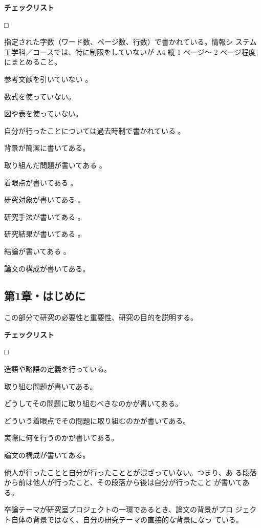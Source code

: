 \documentclass[11pt,a4j]{jsarticle}
\begin{document}
\begin{flushleft}
 {\bf チェックリスト}
\end{flushleft}
\begin{list}%
 {□} %
 {} %
 \item 指定された字数（ワード数、ページ数、行数）で書かれている。情報シ
       ステム工学科／コースでは、特に制限をしていないが A4 縦 1 ページ〜
       2 ページ程度にまとめること。
 \item 参考文献を引いていない \cite{R.A.Day_HowToWrite_Ja_98}。
 \item 数式を使っていない。
 \item 図や表を使っていない。
 \item 自分が行ったことについては過去時制で書かれている
       \cite{R.A.Day_HowToWrite_Ja_98}。
 \item 背景が簡潔に書いてある。
 \item 取り組んだ問題が書いてある \cite{Sakai_HowToWrite_02}。
 \item 着眼点が書いてある \cite{Sakai_HowToWrite_02}。
 \item 研究対象が書いてある \cite{Sakai_HowToWrite_02}。
 \item 研究手法が書いてある \cite{Sakai_HowToWrite_02}。
 \item 研究結果が書いてある \cite{Sakai_HowToWrite_02}。
 \item 結論が書いてある \cite{Sakai_HowToWrite_02}。
 \item 論文の構成が書いてある。
\end{list}


\subsection{第1章・はじめに}

この部分で研究の必要性と重要性、研究の目的を説明する。

\begin{flushleft}
 {\bf チェックリスト}
\end{flushleft}
\begin{list}%
 {□} %
 {} %
 \item 造語や略語の定義を行っている。
 \item 取り組む問題が書いてある。
 \item どうしてその問題に取り組むべきなのかが書いてある。
 \item どういう着眼点でその問題に取り組むのかが書いてある。
 \item 実際に何を行うのかが書いてある。
 \item 論文の構成が書いてある。
 \item 他人が行ったことと自分が行ったこととが混ざっていない。つまり、あ
       る段落から前は他人が行ったこと、その段落から後は自分が行ったこと
       が書いてある。
 \item 卒論テーマが研究室プロジェクトの一環であるとき、論文の背景がプロ
       ジェクト自体の背景ではなく、自分の研究テーマの直接的な背景になっ
       ている。
\end{list}
\end{document}
